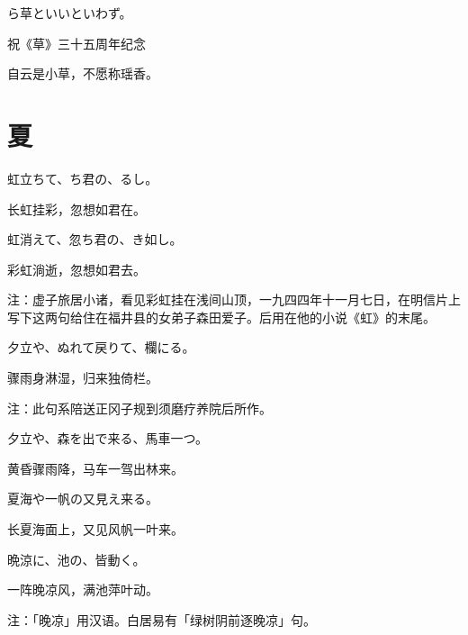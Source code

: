 \begin{haiku}
    {\FH {}ら草といいといわず。}

    {\FK 祝《草》三十五周年纪念}

    {\FK 自云是小草，不愿称瑶香。}
\end{haiku}

\section{\FK 夏}

\setcounter{haikucounter}{0}

\begin{haiku}
    {\FH 虹立ちて、ち君の、るし。}

    {\FK 长虹挂彩，忽想如君在。}
\end{haiku}

\begin{haiku}
    {\FH 虹消えて、忽ち君の、き如し。}

    {\FK 彩虹淌逝，忽想如君去。}

    {\FT 注：虚子旅居小诸，看见彩虹挂在浅间山顶，一九四四年十一月七日，在明信片上写下这两句给住在福井县的女弟子森田爱子。后用在他的小说《虹》的末尾。}
\end{haiku}

\begin{haiku}
    {\FH 夕立や、ぬれて戻りて、欄にる。}

    {\FK 骤雨身淋湿，归来独倚栏。}

    {\FT 注：此句系陪送正冈子规到须磨疗养院后所作。}
\end{haiku}

\begin{haiku}
    {\FH 夕立や、森を出で来る、馬車一つ。}

    {\FK 黄昏骤雨降，马车一驾出林来。}
\end{haiku}

\begin{haiku}
    {\FH 夏海や一帆の又見え来る。}

    {\FK 长夏海面上，又见风帆一叶来。}
\end{haiku}

\begin{haiku}
    {\FH 晩涼に、池の、皆動く。}

    {\FK 一阵晚凉风，满池萍叶动。}

    {\FT 注：「晚凉」用汉语。白居易有「绿树阴前逐晚凉」句。}
\end{haiku}

